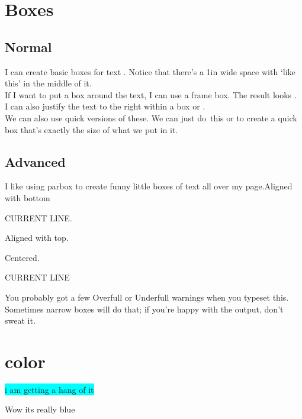 \documentclass[12pt]{article}  %
\begin{document}
\section{Boxes}
\subsection{Normal}
I can create basic boxes for text . Notice that there's a 1in wide space with `like this' in the middle of it.\\
If I want to put a box around the text, I can use a frame box. The result looks .\\
I can also justify the text to the right within a box 
or .\\
We can also use quick versions of these. We can just \mbox{do this} or  to create a quick box that's exactly the size of what we put in it.

\subsection{Advanced}

\parbox[b]{2in}{I like using parbox to create funny little boxes of text all over my page.Aligned with bottom}
CURRENT LINE. \,
\parbox[t]{2in}{Aligned with top.}

\parbox{1.5in}{Centered.} CURRENT LINE \; 
\parbox{2.5in}{You probably got a few Overfull or Underfull warnings when you typeset this. Sometimes narrow boxes will do that; if you're happy with the output, don't sweat it.}

\section{color}

\colorbox{cyan}{i am getting a hang of it}




\newpage
\pagecolor{cyan}


Wow its really blue
\end{document}
